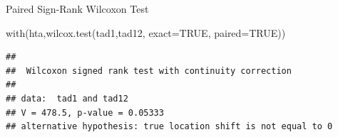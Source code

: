 \documentclass[
  ignorenonframetext,
]{beamer}
\newenvironment{Shaded}{\begin{snugshade}}{\end{snugshade}}
\newcommand{\AttributeTok}[1]{\textcolor[rgb]{0.77,0.63,0.00}{#1}}
\newcommand{\ConstantTok}[1]{\textcolor[rgb]{0.00,0.00,0.00}{#1}}
\newcommand{\FunctionTok}[1]{\textcolor[rgb]{0.00,0.00,0.00}{#1}}
\newcommand{\NormalTok}[1]{#1}
\begin{document}
\begin{frame}[fragile]{Paired Sign-Rank Wilcoxon Test}
\protect\hypertarget{paired-sign-rank-wilcoxon-test}{}
\small

\begin{Shaded}
\begin{Highlighting}[]
\FunctionTok{with}\NormalTok{(hta,}\FunctionTok{wilcox.test}\NormalTok{(tad1,tad12,}
     \AttributeTok{exact=}\ConstantTok{TRUE}\NormalTok{, }\AttributeTok{paired=}\ConstantTok{TRUE}\NormalTok{))}
\end{Highlighting}
\end{Shaded}

\begin{verbatim}
## 
##  Wilcoxon signed rank test with continuity correction
## 
## data:  tad1 and tad12
## V = 478.5, p-value = 0.05333
## alternative hypothesis: true location shift is not equal to 0
\end{verbatim}
\end{frame}
\end{document}
